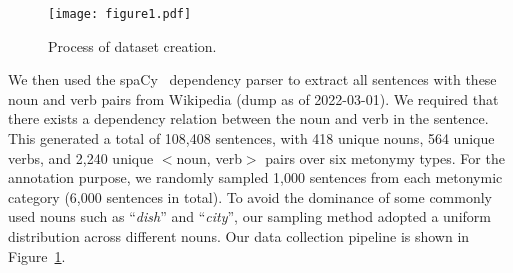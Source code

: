 \documentclass[11pt]{article}
\begin{document}
\begin{figure}
    \centering
    \texttt{[image: figure1.pdf]}
    \caption{Process of dataset creation.}
    \label{fig:dataset_creation}
\end{figure}


We then used the spaCy~\citep{spacy2020} dependency parser to extract all sentences with these noun and verb pairs from Wikipedia (dump as of 2022-03-01). We required that there exists a dependency relation between the noun and verb in the sentence. This generated a total of 108,408 sentences, with 418 unique nouns, 564 unique verbs, and 2,240 unique $<$noun, verb$>$ pairs over six metonymy types. For the annotation purpose, we randomly sampled 1,000 sentences from each metonymic category (6,000 sentences in total). To avoid the dominance of some commonly used nouns such as ``\textit{dish}'' and ``\textit{city}'', our sampling method adopted a uniform distribution across different nouns. Our data collection pipeline is shown in Figure~\ref{fig:dataset_creation}.

\begingroup
\end{document}
